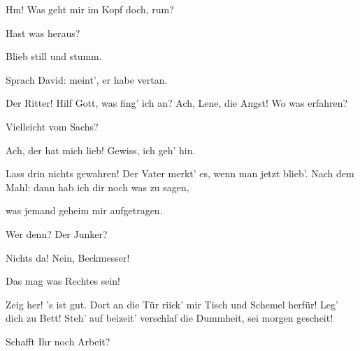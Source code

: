 \begin{drama}

Hm! Was geht mir im Kopf doch, rum?

\Magdalenespeaks


Hast was heraus?

\Evaspeaks



Blieb still und stumm.

\Magdalenespeaks
Sprach David:
meint', er habe vertan.

\Evaspeaks


Der Ritter! Hilf Gott, was fing' ich an?
Ach, Lene, die Angst! Wo was erfahren?

\Magdalenespeaks
Vielleicht vom Sachs?

\Evaspeaks


Ach, der hat mich lieb! Gewiss, ich geh' hin.

\Magdalenespeaks
Lass drin nichts gewahren!
Der Vater merkt' es, wenn man jetzt blieb'.
Nach dem Mahl:
dann hab ich dir noch was zu sagen,


was jemand geheim mir aufgetragen.

\Evaspeaks


Wer denn? Der Junker?

\Magdalenespeaks
Nichts da! Nein, Beckmesser!

\Evaspeaks
Das mag was Rechtes sein!




\scene


\Sachsspeaks
Zeig her! 's ist gut. Dort an die Tür
riick' mir Tisch und Schemel herfür!
Leg' dich zu Bett! Steh' auf beizeit'
verschlaf die Dummheit, sei morgen gescheit!

\Davidspeaks


Schafft Ihr noch Arbeit?


\end{drama}
